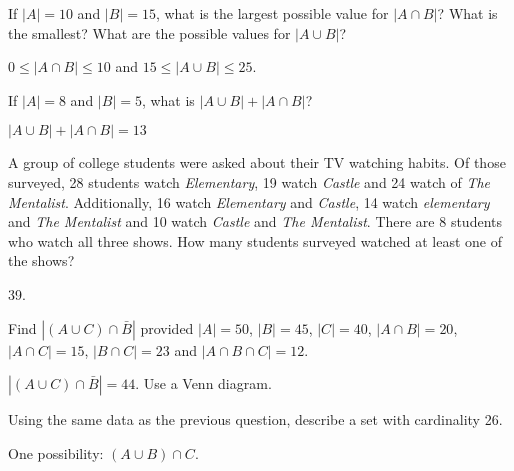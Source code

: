 \begin{questions}
\begin{answer}
  \end{answer}


  
\question If $|A| = 10$ and $|B| = 15$, what is the largest possible value for $|A \cap B|$?  What is the smallest?  What are the possible values for $|A \cup B|$?

  \begin{answer}
    $0 \le |A \cap B| \le 10$ and $15 \le |A \cup B| \le 25$.
  \end{answer}



\question If $|A| = 8$ and $|B| = 5$, what is $|A \cup B| + |A \cap B|$?

  \begin{answer}
      $|A \cup B| + |A \cap B| = 13$
  \end{answer}

  
  
  
\question A group of college students were asked about their TV watching habits.  Of those surveyed, 28 students watch {\em Elementary}, 19 watch {\em Castle} and 24 watch of {\em The Mentalist}.  Additionally, 16 watch {\em Elementary} and {\em Castle}, 14 watch {\em elementary} and {\em The Mentalist} and 10 watch {\em Castle} and {\em The Mentalist}.  There are 8 students who watch all three shows.  How many students surveyed watched at least one of the shows?

  \begin{answer}
    39.
  \end{answer}



\question Find $|(A \cup C)\cap \bar B|$ provided $|A| = 50$, $|B| = 45$, $|C| = 40$, $|A\cap B| = 20$, $|A \cap C| = 15$, $|B \cap C| = 23$ and $|A \cap B \cap C| = 12$.

    \begin{answer}
      $|(A \cup C)\cap \bar B| = 44$.  Use a Venn diagram.
    \end{answer}



\question Using the same data as the previous question, describe a set with cardinality 26.

    \begin{answer}
	One possibility: $(A \cup B) \cap C$.
    \end{answer}


\end{questions}
